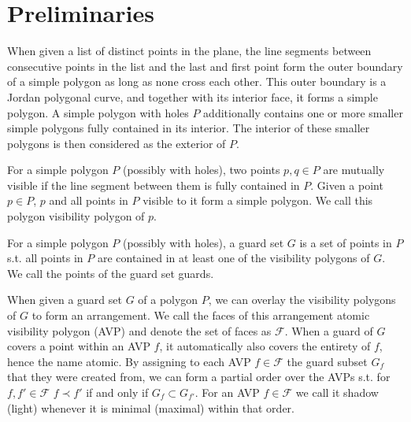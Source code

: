 \chapter{Preliminaries}
\begin{definition}
When given a list of distinct points in the plane, the line segments between consecutive points in the list and the last and first point form the outer boundary of a simple polygon as long as none cross each other. This outer boundary is a Jordan polygonal curve, and together with its interior face, it forms a simple polygon. A simple polygon with holes $P$ additionally contains one or more smaller simple polygons fully contained in its interior. The interior of these smaller polygons is then considered as the exterior of $P$.
\end{definition}

\begin{definition}
For a simple polygon $P$ (possibly with holes), two points $p,q\in P$ are mutually visible if the line segment between them is fully contained in $P$. Given a point $p\in P$, $p$ and all points in $P$ visible to it form a simple polygon. We call this polygon visibility polygon of $p$.
\end{definition}

\begin{definition}
For a simple polygon $P$ (possibly with holes), a guard set $G$ is a set of points in $P$ s.t. all points in $P$ are contained in at least one of the visibility polygons of $G$. We call the points of the guard set guards.
\end{definition}

\begin{definition}
When given a guard set $G$ of a polygon $P$, we can overlay the visibility polygons of $G$ to form an arrangement. We call the faces of this arrangement atomic visibility polygon (AVP) and denote the set of faces as $\mathcal{F}$. When a guard of $G$ covers a point within an AVP $f$, it automatically also covers the entirety of $f$, hence the name atomic. By assigning to each AVP $f\in\mathcal{F}$ the guard subset $G_{f}$ that they were created from, we can form a partial order over the AVPs s.t. for $f,f'\in\mathcal{F}$ $f\prec f'$ if and only if $G_{f}\subset G_{f'}$. For an AVP $f\in\mathcal{F}$ we call it shadow (light) whenever it is minimal (maximal) within that order.
\end{definition}

